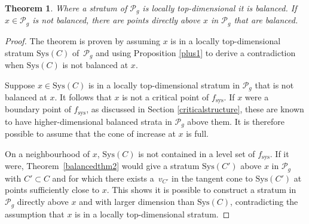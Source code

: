 \documentclass[11pt]{article}
\numberwithin{equation}{section}
\numberwithin{equation}{section}
\newtheorem{Theorem}{Theorem}[section]
\begin{document}
\begin{Theorem}
\label{balancedthm}
Where a stratum of $\mathcal{P}_{g}$ is locally top-dimensional it is balanced. If $x\in \mathcal{P}_{g}$ is not balanced, there are points directly above $x$ in $\mathcal{P}_{g}$ that are balanced.
\end{Theorem}

\begin{proof}
The theorem is proven by assuming $x$ is in a locally top-dimensional stratum $\mathrm{Sys}(C)$ of~$\mathcal{P}_{g}$ and using Proposition \ref{plus1} to derive a contradiction when $\mathrm{Sys}(C)$ is not balanced at $x$.

Suppose $x\in \mathrm{Sys}(C)$ is in a locally top-dimensional stratum in $\mathcal{P}_{g}$ that is not balanced at $x$. It follows that $x$ is not a critical point of $f_{\mathrm{sys}}$. If $x$ were a boundary point of $f_{\mathrm{sys}}$, as discussed in Section \ref{criticalstructure}, these are known to have higher-dimensional balanced strata in $\mathcal{P}_{g}$ above them. It is therefore possible to assume that the cone of increase at $x$ is full.

On a neighbourhood of $x$, $\mathrm{Sys}(C)$ is not contained in a level set of $f_{\mathrm{sys}}$. If it were, Theorem~\ref{balancedthm2} would give a stratum $\mathrm{Sys}(C')$ above $x$ in $\mathcal{P}_{g}$ with $C'\subset C$ and for which there exists a~$v_{C'}$ in the tangent cone to $\mathrm{Sys}(C')$ at points sufficiently close to $x$. This shows it is possible to construct a stratum in $\mathcal{P}_{g}$ directly above $x$ and with larger dimension than $\mathrm{Sys}(C)$, contradicting the assumption that $x$ is in a locally top-dimensional stratum.


\end{proof}
\end{document}
